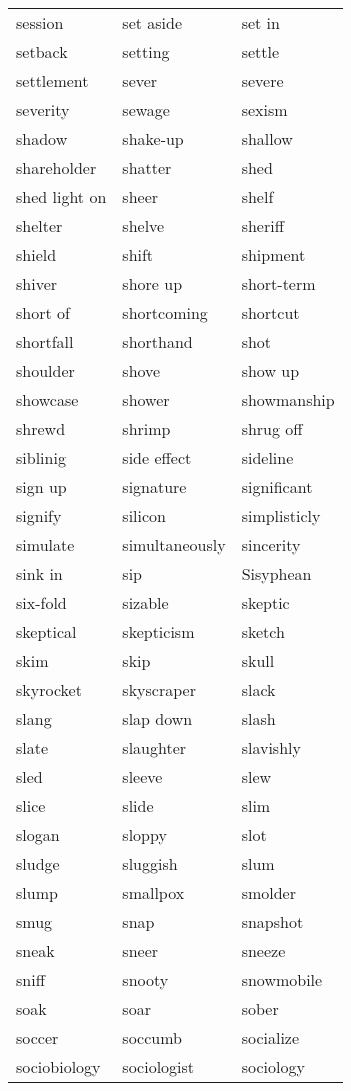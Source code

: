\documentclass{minimal}
\begin{document}
\begin{longtable}{p{2.7cm}@{\hskip 0.2cm}p{2.7cm}@{\hskip 0.2cm}p{2.7cm}}
session & set aside & set in \\
setback & setting & settle \\
settlement & sever & severe \\
severity & sewage & sexism \\
shadow & shake-up & shallow \\
shareholder & shatter & shed \\
shed light on & sheer & shelf \\
shelter & shelve & sheriff \\
shield & shift & shipment \\
shiver & shore up & short-term \\
short of & shortcoming & shortcut \\
shortfall & shorthand & shot \\
shoulder & shove & show up \\
showcase & shower & showmanship \\
shrewd & shrimp & shrug off \\
siblinig & side effect & sideline \\
sign up & signature & significant \\
signify & silicon & simplisticly \\
simulate & simultaneously & sincerity \\
sink in & sip & Sisyphean \\
six-fold & sizable & skeptic \\
skeptical & skepticism & sketch \\
skim & skip & skull \\
skyrocket & skyscraper & slack \\
slang & slap down & slash \\
slate & slaughter & slavishly \\
sled & sleeve & slew \\
slice & slide & slim \\
slogan & sloppy & slot \\
sludge & sluggish & slum \\
slump & smallpox & smolder \\
smug & snap & snapshot \\
sneak & sneer & sneeze \\
sniff & snooty & snowmobile \\
soak & soar & sober \\
soccer & soccumb & socialize \\
sociobiology & sociologist & sociology \\

\end{longtable}
\end{document}

